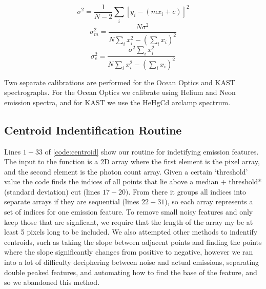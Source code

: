 \documentclass[preprint]{aastex62}
\begin{document}
\begin{equation}
    \sigma^2 = \frac{1}{N-2}\sum_i [y_i - (mx_i + c)]^2
\end{equation}
\begin{equation}
    \sigma_m^2 = \frac{N\sigma^2}{N\sum_i x_i^2 - \left(\sum_i x_i \right)^2}
\end{equation}
\begin{equation}
    \sigma_c^2 = \frac{\sigma^2 \sum_i x_i^2}{N\sum_i x_i^2 - \left(\sum_i x_i \right)^2}
\end{equation}

Two separate calibrations are performed for the Ocean Optics and KAST spectrographs. For the Ocean Optics we calibrate using Helium and Neon emission spectra, and for KAST we use the HeHgCd arclamp spectrum.

\subsection{Centroid Indentification Routine} \label{subsec:centroid}
Lines $1-33$ of \ref{code:centroid} show our routine for indetifying emission features. The input to the function is a 2D array where the first element is the pixel array, and the second element is the photon count array. Given a certain `threshold' value the code finds the indices of all points that lie above a median + threshold*(standard deviation) cut (lines $17-20)$. From there it groups all indices into separate arrays if they are sequential (lines $22-31$), so each array represents a set of indices for one emission feature. To remove small noisy features and only keep those that are signficant, we require that the length of the array my be at least 5 pixels long to be included. We also attempted other methods to indentify centroids, such as taking the slope between adjacent points and finding the points where the slope significantly changes from positive to negative, however we ran into a lot of difficulty deciphering between noise and actual emissions, separating double peaked features, and automating how to find the base of the feature, and so we abandoned this method.
\end{document}
